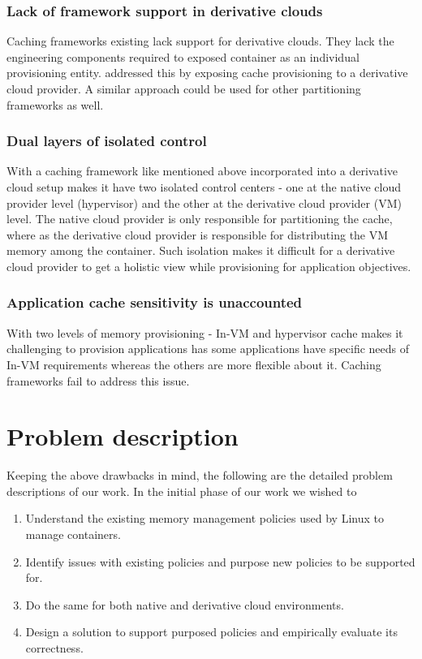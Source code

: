       \subsubsection{Lack of framework support in derivative clouds}
	Caching frameworks existing lack support for derivative clouds. They lack the engineering components required to 
	exposed container as an individual provisioning entity. \dd{} addressed this by exposing cache provisioning to a
	derivative cloud provider. A similar approach could be used for other partitioning frameworks as well.
      
      \subsubsection{Dual layers of isolated control}
	With a caching framework like mentioned above incorporated into a derivative cloud setup makes it have two isolated
	control centers - one at the native cloud provider level (hypervisor) and the other at the derivative 
	cloud provider (VM) level. The native cloud provider is only responsible for partitioning the cache, where as the 
	derivative cloud provider is responsible for distributing the VM memory among the container. Such isolation makes
	it difficult for a derivative cloud provider to get a holistic view while provisioning for application objectives. 
	
      \subsubsection{Application cache sensitivity is unaccounted}
	With two levels of memory provisioning - In-VM and hypervisor cache makes it challenging to provision applications 
	has some applications have specific needs of In-VM requirements whereas the others are more flexible about it. 
	Caching frameworks fail to address this issue.
    
  \section{Problem description}  
    Keeping the above drawbacks in mind, the following are the detailed problem descriptions of our work.
    In the initial phase of our work we wished to 
      \begin{enumerate}
	\item Understand the existing memory management policies used by Linux to manage containers.
	\item Identify issues with existing policies and purpose new policies to be supported for.
	\item Do the same for both native and derivative cloud environments. 
	\item Design a solution to support purposed policies and empirically evaluate its correctness.
      \end{enumerate}


